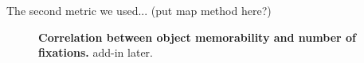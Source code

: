 The second metric we used... (put map method here?)

\begin{figure}[t]
\centering
{}
\vspace{-5mm}\caption{\footnotesize\textbf{Correlation between object memorability and number of fixations.} add-in later. }\label{fig:exampleStimuli}
\end{figure}

